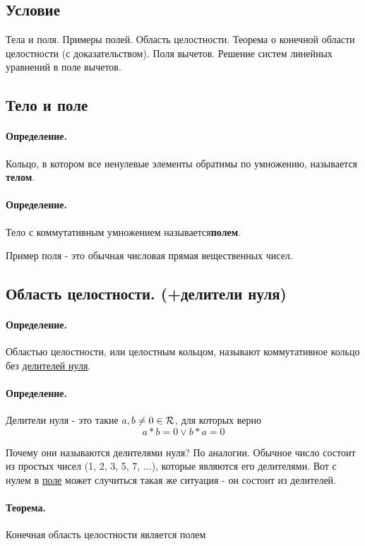 \documentclass{report}
\begin{document}
\subsection{Условие}
Тела и поля. Примеры полей. Область целостности. Теорема о конечной области
целостности (с доказательством). Поля вычетов. Решение систем линейных уравнений
в поле вычетов.

\subsection{Тело и поле}
\paragraph*{Определение.}
Кольцо, в котором все ненулевые элементы обратимы по умножению, называется \textbf{телом}.

\paragraph*{Определение.} Тело с коммутативным умножением называется\newline \textbf{полем}.


Пример поля - это обычная числовая прямая вещественных чисел.

\subsection{Область целостности. (+делители нуля)}
\paragraph*{Определение.}
Областью целостности, или целостным кольцом, называют коммутативное кольцо без \underline{делителей нуля}.

\paragraph*{Определение.}
Делители нуля - это такие $a,b \neq 0 \in {\cal R}$, для которых верно
\[
a * b = 0 \lor b * a = 0
\] 


Почему они называются делителями нуля? По аналогии. Обычное число состоит
из простых чисел (1, 2, 3, 5, 7, $\ldots$), которые являются его делителями.
Вот с нулем в \underline{поле} может случиться такая же ситуация - он состоит из делителей.

\paragraph*{Теорема.}
Конечная область целостности является полем
\end{document}
